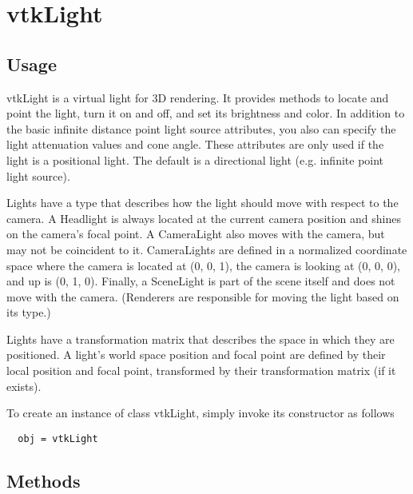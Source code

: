 \section{vtkLight}

\subsection{Usage}

 vtkLight is a virtual light for 3D rendering. It provides methods to locate
 and point the light, turn it on and off, and set its brightness and color.
 In addition to the basic infinite distance point light source attributes,
 you also can specify the light attenuation values and cone angle.
 These attributes are only used if the light is a positional light.
 The default is a directional light (e.g. infinite point light source).

 Lights have a type that describes how the light should move with respect
 to the camera.  A Headlight is always located at the current camera position
 and shines on the camera's focal point.  A CameraLight also moves with
 the camera, but may not be coincident to it.  CameraLights are defined
 in a normalized coordinate space where the camera is located at (0, 0, 1),
 the camera is looking at (0, 0, 0), and up is (0, 1, 0).  Finally, a 
 SceneLight is part of the scene itself and does not move with the camera.
 (Renderers are responsible for moving the light based on its type.)

 Lights have a transformation matrix that describes the space in which
 they are positioned.  A light's world space position and focal point
 are defined by their local position and focal point, transformed by
 their transformation matrix (if it exists).

To create an instance of class vtkLight, simply
invoke its constructor as follows
\begin{verbatim}
  obj = vtkLight
\end{verbatim}
\subsection{Methods}

